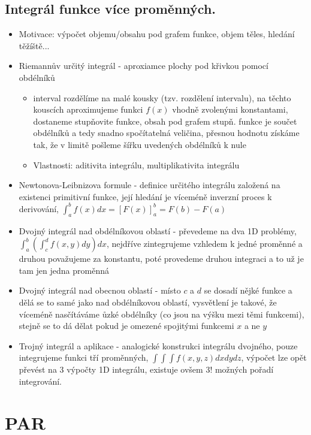 \documentclass[a4paper,hidelinks]{article}
\begin{document}
\subsection{Integrál funkce více proměnných.}

\begin{itemize}
    \item Motivace: výpočet objemu/obsahu pod grafem funkce, objem těles, hledání těžíště...
    \item Riemannův určitý integrál - aproxiamce plochy pod křivkou pomocí obdélníků
    \begin{itemize}
        \item interval rozdělíme na malé kousky (tzv. rozdělení intervalu), na těchto kouscích aproximujeme funkci $f(x)$ vhodně zvolenými konstantami, dostaneme stupňovite funkce, obsah pod grafem stupň. funkce je součet obdélníků a tedy snadno spočítatelná veličina, přesnou hodnotu získáme tak, že v limitě pošleme šířku uvedených obdélníků k nule
        \item Vlastnosti: aditivita integrálu, multiplikativita integrálu
    \end{itemize}
    \item Newtonova-Leibnizova formule - definice určitého integrálu založená na existenci primitivní funkce, její hledání je víceméně inverzní proces k derivování, $\int_a^bf(x)dx=[F(x)]_a^b=F(b)-F(a)$
    \item Dvojný integrál nad obdélníkovou oblastí - převedeme na dva 1D problémy, $\int_a^b(\int_c^df(x,y)dy)dx$, nejdříve zintegrujeme vzhledem k jedné proměnné a druhou považujeme za konstantu, poté provedeme druhou integraci a to už je tam jen jedna proměnná
    \item Dvojný integrál nad obecnou oblastí - místo $c$ a $d$ se dosadí nějké funkce a dělá se to samé jako nad obdélníkovou oblastí, vysvětlení je takové, že víceméně nasčítáváme ůzké obdélníky (co jsou na výšku mezi těmi funkcemi), stejně se to dá dělat pokud je omezené spojitými funkcemi $x$ a ne $y$
    \item Trojný integrál a aplikace - analogické konstrukci integrálu dvojného, pouze integrujeme funkci tří proměnných, $\int\int\int f(x,y,z)dxdydz$, výpočet lze opět převést na 3 výpočty 1D integrálu, existuje  ovšem 3! možných pořadí integrování.
\end{itemize}


\section{PAR}
\end{document}

